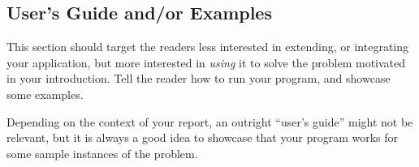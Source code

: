 \subsection{User's Guide and/or Examples}

\label{sec:users-guide-and-examples}

This section should target the readers less interested in extending, or
integrating your application, but more interested in \emph{using} it to solve
the problem motivated in your introduction. Tell the reader how to run your
program, and showcase some examples.

Depending on the context of your report, an outright ``user's guide'' might not
be relevant, but it is always a good idea to showcase that your program works
for some sample instances of the problem.
